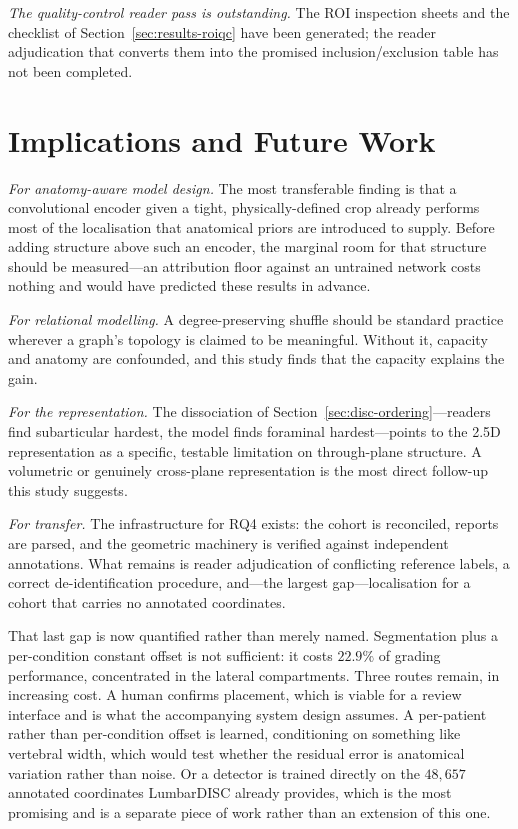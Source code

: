 \documentclass[12pt,a4paper]{report}
\begin{document}
\emph{The quality-control reader pass is outstanding.} The ROI inspection
sheets and the checklist of Section~\ref{sec:results-roiqc} have been generated;
the reader adjudication that converts them into the promised
inclusion/exclusion table has not been completed.

\section{Implications and Future Work}
\label{sec:disc-future}

\emph{For anatomy-aware model design.} The most transferable finding is that a
convolutional encoder given a tight, physically-defined crop already performs
most of the localisation that anatomical priors are introduced to supply. Before
adding structure above such an encoder, the marginal room for that structure
should be measured---an attribution floor against an untrained network costs
nothing and would have predicted these results in advance.

\emph{For relational modelling.} A degree-preserving shuffle should be standard
practice wherever a graph's topology is claimed to be meaningful. Without it,
capacity and anatomy are confounded, and this study finds that the capacity
explains the gain.

\emph{For the representation.} The dissociation of
Section~\ref{sec:disc-ordering}---readers find subarticular hardest, the model
finds foraminal hardest---points to the 2.5D representation as a specific,
testable limitation on through-plane structure. A volumetric or genuinely
cross-plane representation is the most direct follow-up this study suggests.

\emph{For transfer.} The infrastructure for RQ4 exists: the cohort is
reconciled, reports are parsed, and the geometric machinery is verified against
independent annotations. What remains is reader adjudication of conflicting
reference labels, a correct de-identification procedure, and---the largest
gap---localisation for a cohort that carries no annotated coordinates.

That last gap is now quantified rather than merely named. Segmentation plus a
per-condition constant offset is not sufficient: it costs $22.9\%$ of grading
performance, concentrated in the lateral compartments. Three routes remain, in
increasing cost. A human confirms placement, which is viable for a review
interface and is what the accompanying system design assumes. A per-patient
rather than per-condition offset is learned, conditioning on something like
vertebral width, which would test whether the residual error is anatomical
variation rather than noise. Or a detector is trained directly on the
$48{,}657$ annotated coordinates LumbarDISC already provides, which is the most
promising and is a separate piece of work rather than an extension of this one.
\end{document}
